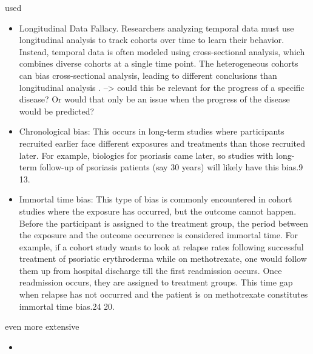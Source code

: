 \rawcitationstart
used
\begin{itemize}		
	\rawcitationusedstart
	\item Longitudinal Data Fallacy. Researchers analyzing temporal data must use longitudinal analysis to track cohorts over time to learn their behavior. Instead, temporal data is often modeled using cross-sectional analysis, which combines diverse cohorts at a single time point. The heterogeneous cohorts can bias cross-sectional analysis, leading to different conclusions than longitudinal analysis \autocite{Mehrabi_2021}. --> could this be relevant for the progress of a specific disease? Or would that only be an issue when the progress of the disease would be predicted?
	\item  Chronological bias: This occurs in long-term studies where participants recruited earlier face different exposures and treatments than those recruited later. For example, biologics for psoriasis came later, so studies with long-term follow-up of psoriasis patients (say 30 years) will likely have this bias.9 13.\autocite{Chakraborty_2023}
	\item Immortal time bias: This type of bias is commonly encountered in cohort studies where the exposure has occurred, but the outcome cannot happen. Before the participant is assigned to the treatment group, the period between the exposure and the outcome occurrence is considered immortal time. For example, if a cohort study wants to look at relapse rates following successful treatment of psoriatic erythroderma while on methotrexate, one would follow them up from hospital discharge till the first readmission occurs. Once readmission occurs, they are assigned to treatment groups. This time gap when relapse has not occurred and the patient is on methotrexate constitutes immortal time bias.24 20.\autocite{Chakraborty_2023}
	\rawcitationusedend
\end{itemize}

even more extensive
\begin{itemize}
	\item 
\end{itemize}

